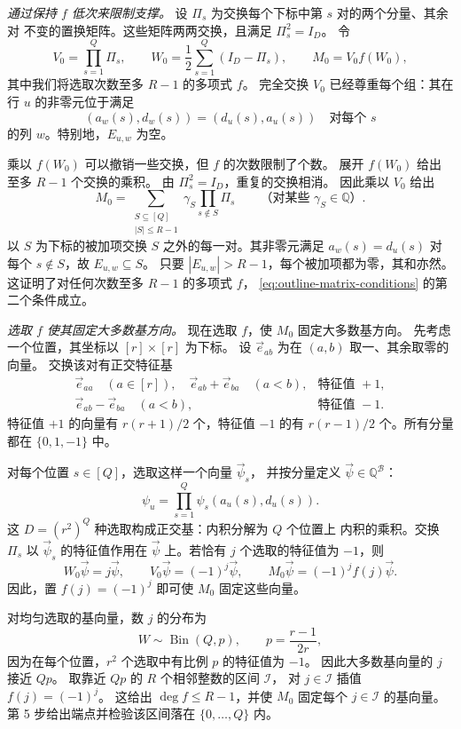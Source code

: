 \documentclass[11pt,reqno]{amsart}
\numberwithin{equation}{section}
\theoremstyle{definition}\newtheorem{definition}[theorem]{定义}
\theoremstyle{remark}\newtheorem{remark}[theorem]{注}
\renewcommand{\le}{\leqslant}
\begin{document}
\smallskip\noindent
\emph{通过保持 $f$ 低次来限制支撑。}
设 $\Pi_s$ 为交换每个下标中第 $s$ 对的两个分量、其余对
不变的置换矩阵。这些矩阵两两交换，且满足 $\Pi_s^2=I_D$。
令
\[
 V_0=\prod_{s=1}^Q\Pi_s,\qquad
 W_0=\frac12\sum_{s=1}^Q(I_D-\Pi_s),\qquad
 M_0=V_0f(W_0),
\]
其中我们将选取次数至多 $R-1$ 的多项式 $f$。
完全交换 $V_0$ 已经尊重每个组：其在行 $u$ 的非零元位于满足
\[
 (a_w(s),d_w(s))=(d_u(s),a_u(s))\quad\text{对每个 }s
\]
的列 $w$。特别地，$E_{u,w}$ 为空。

乘以 $f(W_0)$ 可以撤销一些交换，但 $f$ 的次数限制了个数。
展开 $f(W_0)$ 给出至多 $R-1$ 个交换的乘积。
由 $\Pi_s^2=I_D$，重复的交换相消。
因此乘以 $V_0$ 给出
\begin{equation}\label{eq:overview-partial-swaps}
 M_0=\sum_{\substack{S\subseteq[Q]\\|S|\le R-1}}
             \gamma_S\prod_{s\notin S}\Pi_s
 \qquad\text{（对某些 }\gamma_S\in\mathbb Q\text{）}.
\end{equation}
以 $S$ 为下标的被加项交换 $S$ 之外的每一对。其非零元满足
$a_w(s)=d_u(s)$ 对每个 $s\notin S$，故 $E_{u,w}\subseteq S$。
只要 $|E_{u,w}|>R-1$，每个被加项都为零，其和亦然。
这证明了对任何次数至多 $R-1$ 的多项式 $f$，
\eqref{eq:outline-matrix-conditions} 的第二个条件成立。

\smallskip\noindent
\emph{选取 $f$ 使其固定大多数基方向。}
现在选取 $f$，使 $M_0$ 固定大多数基方向。
先考虑一个位置，其坐标以 $[r]\times[r]$ 为下标。
设 $\vec e_{ab}$ 为在 $(a,b)$ 取一、其余取零的向量。
交换该对有正交特征基
\[
 \begin{array}{ll}
 \vec e_{aa}\quad(a\in[r]),\quad
 \vec e_{ab}+\vec e_{ba}\quad(a<b),
     &\text{特征值 }+1,\\[2pt]
 \vec e_{ab}-\vec e_{ba}\quad(a<b),
     &\text{特征值 }-1.
 \end{array}
\]
特征值 $+1$ 的向量有 $r(r+1)/2$ 个，特征值 $-1$ 的有
$r(r-1)/2$ 个。所有分量都在 $\{0,1,-1\}$ 中。

对每个位置 $s\in[Q]$，选取这样一个向量 $\vec\psi_s$，
并按分量定义 $\vec\psi\in\mathbb Q^{\mathcal B}$：
\[
 \psi_u=\prod_{s=1}^Q\psi_s(a_u(s),d_u(s)).
\]
这 $D=(r^2)^Q$ 种选取构成正交基：内积分解为 $Q$ 个位置上
内积的乘积。交换 $\Pi_s$ 以 $\vec\psi_s$ 的特征值作用在
$\vec\psi$ 上。若恰有 $j$ 个选取的特征值为 $-1$，则
\[
 W_0\vec\psi=j\vec\psi,\qquad
 V_0\vec\psi=(-1)^j\vec\psi,\qquad
 M_0\vec\psi=(-1)^jf(j)\vec\psi.
\]
因此，置 $f(j)=(-1)^j$ 即可使 $M_0$ 固定这些向量。

对均匀选取的基向量，数 $j$ 的分布为
\[
 W\sim\operatorname{Bin}(Q,p),\qquad p=\frac{r-1}{2r},
\]
因为在每个位置，$r^2$ 个选取中有比例 $p$ 的特征值为 $-1$。
因此大多数基向量的 $j$ 接近 $Qp$。
取靠近 $Qp$ 的 $R$ 个相邻整数的区间 $\mathcal I$，
对 $j\in\mathcal I$ 插值 $f(j)=(-1)^j$。
这给出 $\deg f\le R-1$，并使 $M_0$ 固定每个 $j\in\mathcal I$
的基向量。第 5 步给出端点并检验该区间落在 $\{0,\ldots,Q\}$
内。
\end{document}
